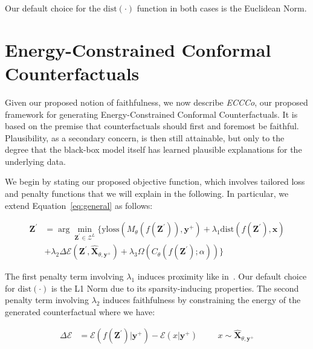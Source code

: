 Our default choice for the $\text{dist}(\cdot)$ function in both cases is the Euclidean Norm.

\section{Energy-Constrained Conformal Counterfactuals}\label{meth}

Given our proposed notion of faithfulness, we now describe \textit{ECCCo}, our proposed framework for generating Energy-Constrained Conformal Counterfactuals. It is based on the premise that counterfactuals should first and foremost be faithful. Plausibility, as a secondary concern, is then still attainable, but only to the degree that the black-box model itself has learned plausible explanations for the underlying data. 

We begin by stating our proposed objective function, which involves tailored loss and penalty functions that we will explain in the following. In particular, we extend Equation~\ref{eq:general} as follows:

\begin{equation} \label{eq:eccco}
  \begin{aligned}
  \mathbf{Z}^\prime &= \arg \min_{\mathbf{Z}^\prime \in \mathcal{Z}^L} \{  {\text{yloss}(M_{\theta}(f(\mathbf{Z}^\prime)),\mathbf{y}^+)}+ \lambda_{1} {\text{dist}(f(\mathbf{Z}^\prime),\mathbf{x}) } \\
  &+ \lambda_2 \Delta\mathcal{E}(\mathbf{Z}^\prime,\widehat{\mathbf{X}}_{\theta,\mathbf{y}^+}) + \lambda_3 \Omega(C_{\theta}(f(\mathbf{Z}^\prime);\alpha)) \} 
  \end{aligned} 
\end{equation}

The first penalty term involving $\lambda_1$ induces proximity like in~\citet{wachter2017counterfactual}. Our default choice for $\text{dist}(\cdot)$ is the L1 Norm due to its sparsity-inducing properties. The second penalty term involving $\lambda_2$ induces faithfulness by constraining the energy of the generated counterfactual where we have:

\begin{equation} \label{eq:energy-delta}
  \begin{aligned}
    \Delta\mathcal{E}&=\mathcal{E}(f(\mathbf{Z}^\prime)|\mathbf{y}^+)-\mathcal{E}(x|\mathbf{y}^+) &&& x \sim \widehat{\mathbf{X}}_{\theta,\mathbf{y}^+}
  \end{aligned}
\end{equation}

